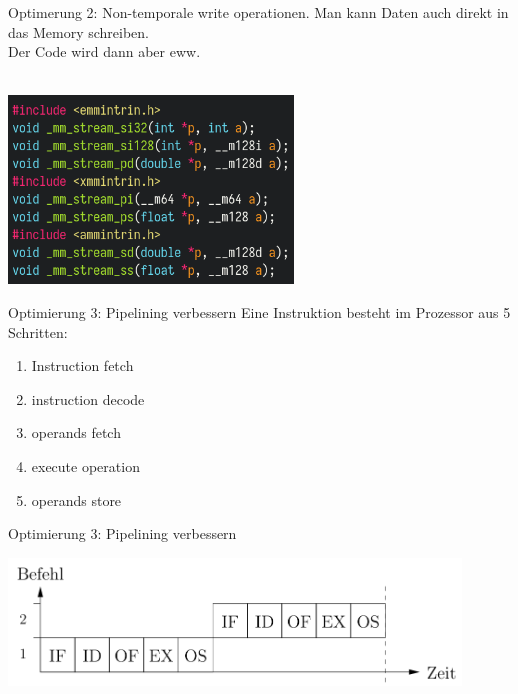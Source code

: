 \documentclass{beamer}
\begin{document}
\begin{frame}{Optimerung 2: Non-temporale write operationen.}
Man kann Daten auch direkt in das Memory schreiben.\\
\pause
Der Code wird dann aber eww.\\~\\
\centerline{\includegraphics[height=5cm]{nontemporal.png}}
\end{frame}

\begin{frame}{Optimierung 3: Pipelining verbessern}
Eine Instruktion besteht im Prozessor aus 5 Schritten:\\
\begin{enumerate}
    \item Instruction fetch
    \pause
    \item instruction decode
    \pause
    \item operands fetch
    \pause
    \item execute operation
    \pause
    \item operands store
\end{enumerate}
\end{frame}

\begin{frame}{Optimierung 3: Pipelining verbessern}
\centerline{\includegraphics[width=12cm]{if1.png}}
\end{frame}
\end{document}

